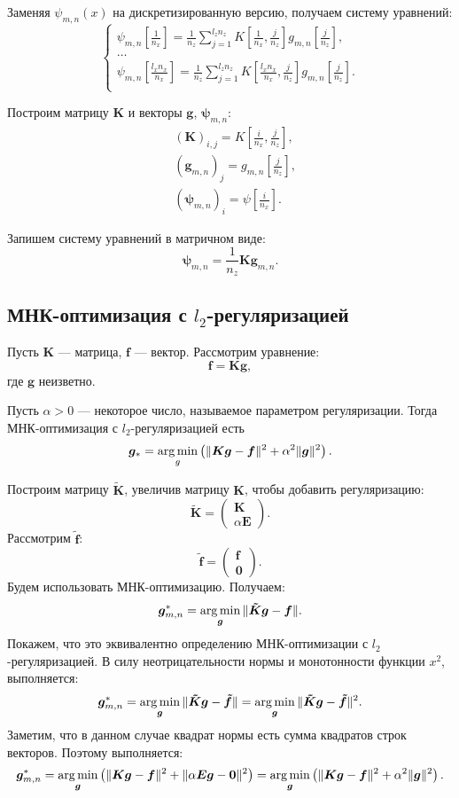 \documentclass[../paper.tex]{subfiles}
\begin{document}
Заменяя $\psi_{m,n}(x)$ на дискретизированную версию, получаем систему уравнений:
\[
	\begin{cases}
		\psi_{m,n}\left[ \frac{1}{n_x} \right]
		= \frac{1}{n_z} \sum_{j=1}^{l_z n_z} K\left[\frac{1}{n_x}, \frac{j}{n_z}\right] g_{m,n}\left[\frac{j}{n_z}\right],\\
		\dots\\
		\psi_{m,n}\left[ \frac{l_x n_x}{n_x} \right]
		= \frac{1}{n_z} \sum_{j=1}^{l_z n_z} K\left[\frac{l_x n_x}{n_x}, \frac{j}{n_z}\right] g_{m,n}\left[\frac{j}{n_z}\right].\\
	\end{cases}
\]

Построим матрицу $\bm{K}$ и векторы $\bm{g}$, $\bm{\psi}_{m,n}$:
\begin{align*}
	&\left(\bm{K}\right)_{i,j}    = K\left[\frac{i}{n_x}, \frac{j}{n_z}\right],\\
	&\left(\bm{g}_{m,n}\right)_j      = g_{m,n}\left[\frac{j}{n_z}\right],\\
	&\left(\bm{\psi}_{m,n}\right)_i = \psi\left[\frac{i}{n_x}\right].
\end{align*}

Запишем систему уравнений в матричном виде:
\[
	\bm{\psi}_{m,n} = \frac{1}{n_z} \bm{K} \bm{g}_{m,n}
.\]

\subsection{МНК-оптимизация с $l_2$-регуляризацией}
\begin{Def}
	Пусть $\bm{K}$ --- матрица, $\bm{f}$ --- вектор.
	Рассмотрим уравнение:
	\[
		\bm{f} = \bm{K}\bm{g}
	,\] где $\bm{g}$ неизветно.

	Пусть $\alpha > 0$ --- некоторое число, называемое параметром регуляризации.
	Тогда МНК-оптимизация с $l_2$-регуляризацией есть
	\[
		\bm{g}_{*} = \operatorname*{arg\,min}_g \left( \| \bm{K}\bm{g} - \bm{f} \|^2 + \alpha^2 \|\bm{g}\|^2 \right)
	.\]
\end{Def}
Построим матрицу $\bm{\tilde K}$, увеличив матрицу $\bm{K}$, чтобы добавить регуляризацию:
\[
	\bm{\tilde K} = 
	\begin{pmatrix}
	    \bm{K} \\
	    \alpha \bm{E}
	\end{pmatrix}
.\]
Рассмотрим $\bm{\tilde f}$:
\[
	\bm{\tilde f} = 
	\begin{pmatrix}
	    \bm{f} \\
	    \bm{0}
	\end{pmatrix}
.\]
Будем использовать МНК-оптимизацию. Получаем:
\[
	\bm{g}_{m,n}^* = \operatorname*{arg\,min}_{\bm{g}} \| \bm{\tilde K} \bm{g} - \bm{f} \|
.\]
Покажем, что это эквивалентно определению МНК-оптимизации с $l_2$-регуляризацией.
В силу неотрицательности нормы и монотонности функции $x^2$, выполняется:
\[
	\bm{g}_{m,n}^* = \operatorname*{arg\,min}_{\bm{g}} \| \bm{\tilde K} \bm{g} - \bm{\tilde f} \|
	= \operatorname*{arg\,min}_{\bm{g}} \| \bm{\tilde K} \bm{g} - \bm{\tilde f} \|^2.
\]
Заметим, что в данном случае квадрат нормы есть сумма квадратов строк векторов. Поэтому выполняется:
\[
	\bm{g}_{m,n}^* 
	= \operatorname*{arg\,min}_{\bm{g}} \left(\| \bm{K} \bm{g} - \bm{f} \|^2 + \| \alpha \bm{E} \bm{g} - \bm{0} \|^2\right)
	= \operatorname*{arg\,min}_{\bm{g}} \left(\| \bm{K} \bm{g} - \bm{f} \|^2 + \alpha^2 \| \bm{g} \|^2\right).
\]
%
\end{document}
